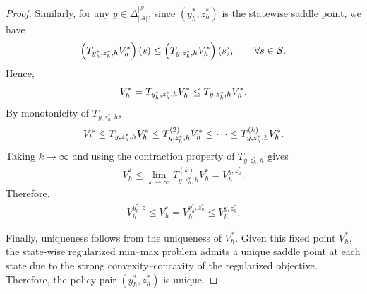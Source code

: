 \documentclass[10pt,a4paper]{amsart}
\def\cA{\mathcal A}
\def\cS{\mathcal S}
\begin{document}
\begin{proof}
    Similarly, for any $y\in\Delta_{|\cA|}^{|\cS|}$, since
    $(y_h^*,z_h^*)$ is the statewise saddle point, we have
    \begin{align}
        \left(T_{y_h^*,z_h^*,h}V_h^*\right)(s)
        \le
        \left(T_{y,z_h^*,h}V_h^*\right)(s),
        \qquad \forall s\in\cS .\notag
    \end{align}
    Hence,
    \begin{align}
        V_h^*
        =
        T_{y_h^*,z_h^*,h}V_h^*
        \le
        T_{y,z_h^*,h}V_h^* .\notag
    \end{align}
    By monotonicity of $T_{y,z_h^*,h}$,
    \begin{align}
        V_h^*
        \le
        T_{y,z_h^*,h}V_h^*
        \le
        T_{y,z_h^*,h}^{(2)}V_h^*
        \le
        \cdots
        \le
        T_{y,z_h^*,h}^{(k)}V_h^* . \notag
    \end{align}
    Taking $k\to\infty$ and using the contraction property of
    $T_{y,z_h^*,h}$ gives
    \begin{align}
        V_h^*
        \le
        \lim_{k\to\infty}
        T_{y,z_h^*,h}^{(k)}V_h^*
        =
        V_h^{y,z_h^*}.
    \end{align}
    Therefore,
    \begin{align}
        V_h^{y_h^*,z}
        \le
        V_h^*
        =
        V_h^{y_h^*,z_h^*}
        \le
        V_h^{y,z_h^*}. 
    \end{align}

Finally, uniqueness follows from the uniqueness of $V_h^*$. Given this
fixed point $V_h^*$, the state-wise regularized min--max problem admits a
unique saddle point at each state due to the strong convexity--concavity of
the regularized objective. Therefore, the policy pair $(y_h^*, z_h^*)$ is
unique.
\end{proof}
\end{document}
